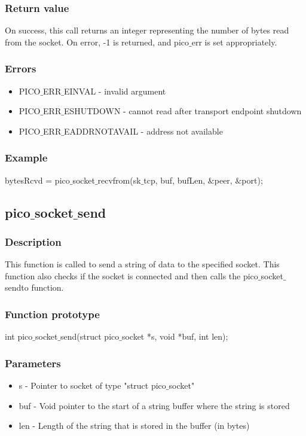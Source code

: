 \subsubsection*{Return value}
On success, this call returns an integer representing the number of bytes read from the socket.
On error, -1 is returned, and pico$\_$err is set appropriately.

\subsubsection*{Errors}
\begin{itemize}
\item PICO$\_$ERR$\_$EINVAL - invalid argument
\item PICO$\_$ERR$\_$ESHUTDOWN - cannot read after transport endpoint shutdown
\item PICO$\_$ERR$\_$EADDRNOTAVAIL - address not available
\end{itemize}

\subsubsection*{Example}
bytesRcvd = pico$\_$socket$\_$recvfrom(sk$\_$tcp, buf, bufLen, $\&$peer, $\&$port);


\subsection{pico$\_$socket$\_$send}

\subsubsection*{Description}
This function is called to send a string of data to the specified socket.
This function also checks if the socket is connected and then calls the
pico$\_$socket$\_$sendto function.

\subsubsection*{Function prototype}
int pico$\_$socket$\_$send(struct pico$\_$socket *s, void *buf, int len);

\subsubsection*{Parameters}
\begin{itemize}
\item s - Pointer to socket of type "struct pico$\_$socket"
\item buf - Void pointer to the start of a string buffer where the string is stored
\item len - Length of the string that is stored in the buffer (in bytes)
\end{itemize}

